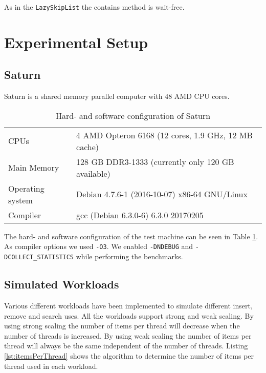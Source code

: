 \noindent As in the \texttt{LazySkipList} the contains method is wait-free.

\section{Experimental Setup}

\subsection{Saturn} \label{subsec:saturn}
Saturn is a shared memory parallel computer with 48 AMD CPU cores.

\begin{table}[H]
  \caption{Hard- and software configuration of Saturn}
  \label{tab:saturn} 
  \begin{center}
    \begin{tabular}{ll}
      \hline
      CPUs & 4 AMD Opteron 6168 (12 cores, 1.9 GHz, 12 MB cache)\\
      Main Memory & 128 GB DDR3-1333 (currently only 120 GB available)\\
      Operating system & Debian 4.7.6-1 (2016-10-07) x86-64 GNU/Linux\\
      Compiler & gcc (Debian 6.3.0-6) 6.3.0 20170205\\\hline
    \end{tabular}
  \end{center}
\end{table}

\noindent The hard- and software configuration of the test machine can be seen in Table \ref{tab:saturn}. As compiler options we used \verb|-O3|. We enabled \verb|-DNDEBUG| and \verb|-DCOLLECT_STATISTICS| while performing the benchmarks.

\subsection{Simulated Workloads}

Various different workloads have been implemented to simulate different insert, remove and search uses. All the workloads support strong and weak scaling. By using strong scaling the number of items per thread will decrease when the number of threads is increased. By using weak scaling the number of items per thread will always be the same independent of the number of threads. Listing \ref{lst:itemsPerThread} shows the algorithm to determine the number of items per thread used in each workload.

